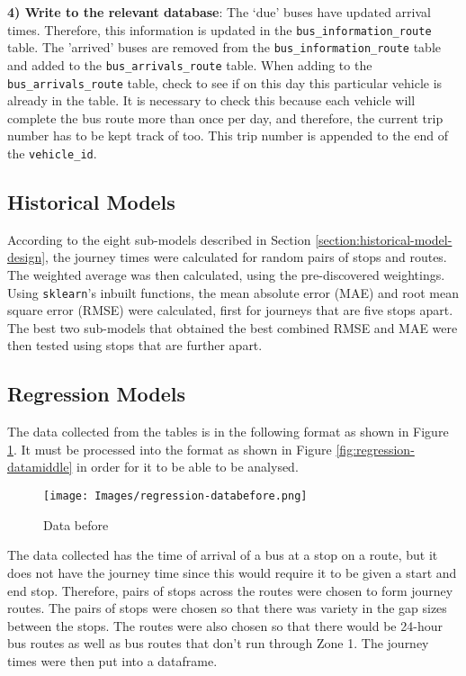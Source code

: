 \textbf{4) Write to the relevant database}: The `due' buses have updated arrival times. Therefore, this information is updated in the \texttt{bus\_information\_route} table. The 'arrived' buses are removed from the \texttt{bus\_information\_route} table and added to the \texttt{bus\_arrivals\_route} table. When adding to the \texttt{bus\_arrivals\_route} table, check to see if on this day this particular vehicle is already in the table. It is necessary to check this because each vehicle will complete the bus route more than once per day, and therefore, the current trip number has to be kept track of too. This trip number is appended to the end of the \texttt{vehicle\_id}.

\subsection{Historical Models}

According to the eight sub-models described in Section \ref{section:historical-model-design}, the journey times were calculated for random pairs of stops and routes. The weighted average was then calculated, using the pre-discovered weightings. Using \texttt{sklearn}'s inbuilt functions, the mean absolute error (MAE) and root mean square error (RMSE) were calculated, first for journeys that are five stops apart. The best two sub-models that obtained the best combined RMSE and MAE were then tested using stops that are further apart. 

\subsection{Regression Models}

The data collected from the tables is in the following format as shown in Figure \ref{fig:regression-databefore}. It must be processed into the format as shown in Figure \ref{fig:regression-datamiddle} in order for it to be able to be analysed.

\begin{figure}[H]
\begin{center}
    \texttt{[image: Images/regression-databefore.png]}
    \caption{Data before}
    \label{fig:regression-databefore}
\end{center}
\end{figure}

The data collected has the time of arrival of a bus at a stop on a route, but it does not have the journey time since this would require it to be given a start and end stop. Therefore, pairs of stops across the routes were chosen to form journey routes. The pairs of stops were chosen so that there was variety in the gap sizes between the stops. The routes were also chosen so that there would be 24-hour bus routes as well as bus routes that don't run through Zone 1. The journey times were then put into a dataframe. \\

